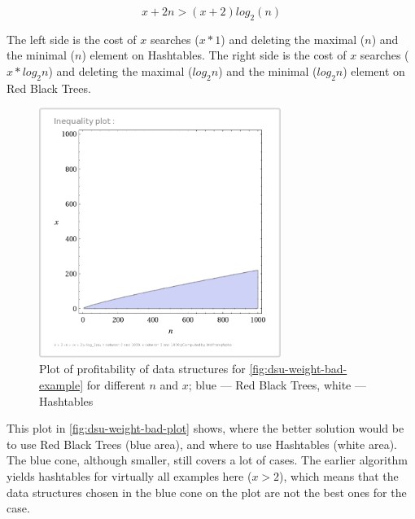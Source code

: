 \documentclass[a4paper,11pt]{article}
\begin{document}
            \begin{equation}
                x + 2n > (x + 2)log_2(n)
            \end{equation}
            
            The left side is the cost of $x$ searches ($x * 1$) and deleting the maximal ($n$) and the minimal ($n$) element on Hashtables.
            The right side is the cost of $x$ searches ($x * log_2 n$) and deleting the maximal ($log_2 n$) and the minimal ($log_2 n$) element on Red Black Trees.
                \begin{figure}[!h]
                \begin{center}
                    \includegraphics[width=0.7\textwidth]{thesis-pics/dsu-weight-example.png}
                \end{center}

                \caption{Plot of profitability of data structures for \autoref{fig:dsu-weight-bad-example} for different
                $n$ and $x$; blue --- Red Black Trees, white --- Hashtables}

                \label{fig:dsu-weight-bad-plot}
            \end{figure}

            This plot in \autoref{fig:dsu-weight-bad-plot} shows, where the better solution would be to use Red Black
            Trees (blue area), and where to use Hashtables (white area). The blue cone, although smaller, still covers a
            lot of cases. The earlier algorithm yields hashtables for virtually all examples here ($x > 2$), which means
            that the data structures chosen in the blue cone on the plot are not the best ones for the case.
\end{document}
